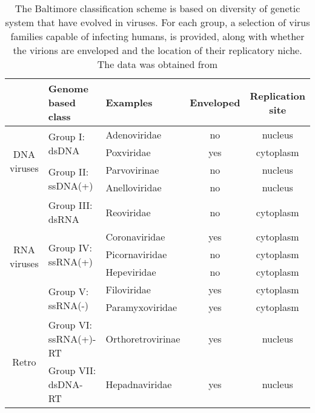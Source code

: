 \renewcommand{\arraystretch}{1.5}

\begin{table}
  \label{tab:baltimore-classification}
  \centering
  \caption[The Baltimore classification scheme for viruses]{The Baltimore classification scheme is based on diversity of genetic system that have evolved in viruses. For each group, a selection of virus families capable of infecting humans, is provided, along with whether the virions are enveloped and the location of their replicatory niche. The data was obtained from \cite{Hulo2011}}
  \footnotesize
  \begin{tabular}{c|l|l|c|c}
    & Genome based class & Examples & Enveloped & Replication site \\
    \hline \multirow{4}{*}{\begin{sideways}DNA viruses\end{sideways}} &
    \multirow{2}{*}{Group I: dsDNA} &
    Adenoviridae &
    no & nucleus \\
    \cline{3-5} &
    & Poxviridae &
    yes & cytoplasm \\
    \cline{2-5} &
    \multirow{2}{*}{Group II: ssDNA(+)} &
    Parvovirinae &
    no & nucleus \\
    \cline{3-5} &
    & Anelloviridae &
    no & nucleus \\
    \hline \multirow{6}{*}{\begin{sideways}RNA viruses\end{sideways}} &   
    Group III: dsRNA &
    Reoviridae &
    no & cytoplasm \\
    \cline{2-5} &
    \multirow{3}{*}{Group IV: ssRNA(+)} &
    Coronaviridae &
    yes & cytoplasm \\
    \cline{3-5} &
    & Picornaviridae &
    no & cytoplasm \\
    \cline{3-5} &
    & Hepeviridae &
    no & cytoplasm \\
    \cline{2-5} &
    \multirow{2}{*}{Group V: ssRNA(-)} &
    Filoviridae &
    yes & cytoplasm \\
    \cline{3-5} &
    & Paramyxoviridae &
    yes & cytoplasm \\
    \hline \multirow{2}{*}{\begin{sideways}Retro\end{sideways}} &   
    Group VI: ssRNA(+)-RT &
    Orthoretrovirinae &
    yes & nucleus \\
    \cline{2-5} &
    Group VII: dsDNA-RT &
    Hepadnaviridae &
    yes & nucleus
  \end{tabular}
\end{table}

